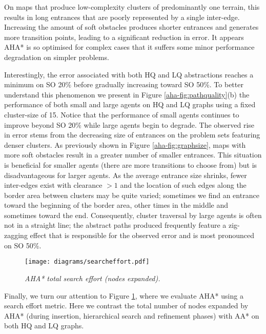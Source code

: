 On maps that produce low-complexity clusters of predominantly one terrain, this results in long entrances that are poorly represented by a single inter-edge.
Increasing the amount of soft obstacles produces shorter entrances and generates more transition points, leading to a significant reduction in error. 
It appears AHA* is so optimised for complex cases that it suffers some minor performance degradation on simpler problems. 
\par \indent
Interestingly, the error associated with both HQ and LQ abstractions reaches a minimum on SO 20\% before gradually increasing toward SO 50\%. 
To better understand this phenomenon we present in Figure \ref{aha-fig:pathquality}(b) the performance of both small and large agents on HQ and LQ graphs using a fixed cluster-size of 15.
Notice that the performance of small agents continues to improve beyond SO 20\% while large agents begin to degrade.
The observed rise in error stems from the decreasing size of entrances on the problem sets featuring denser clusters. 
As previously shown in Figure \ref{aha-fig:graphsize}, maps with more soft obstacles result in a greater number of smaller entrances. 
This situation is beneficial for smaller agents (there are more transitions to choose from) but is disadvantageous for larger agents.
As the average entrance size shrinks, fewer inter-edges exist with clearance $>1$ and the location of such edges along the border area between clusters may be quite varied; sometimes we find an entrance toward the beginning of the border area, other times in the middle and sometimes toward the end.
Consequently, cluster traversal by large agents is often not in a straight line; the abstract paths produced frequently feature a zig-zagging effect that is responsible for the observed error and is most pronounced on SO 50\%.
\begin{figure}[htbp]
	\vspace{-12pt}
	\caption{\small{\emph{AHA* total search effort (nodes expanded).}}}
	\begin{center}
		       \texttt{[image: diagrams/searcheffort.pdf]}
	\end{center}
	\label{aha-fig:searcheffort}
	\vspace{-2pt}
\end{figure}
%
\par \indent
Finally, we turn our attention to Figure \ref{aha-fig:searcheffort}, where we evaluate AHA* using a search effort metric.
Here we contrast the total number of nodes expanded by AHA* (during insertion, hierarchical search and refinement phases) with AA* on both HQ and LQ graphs.
